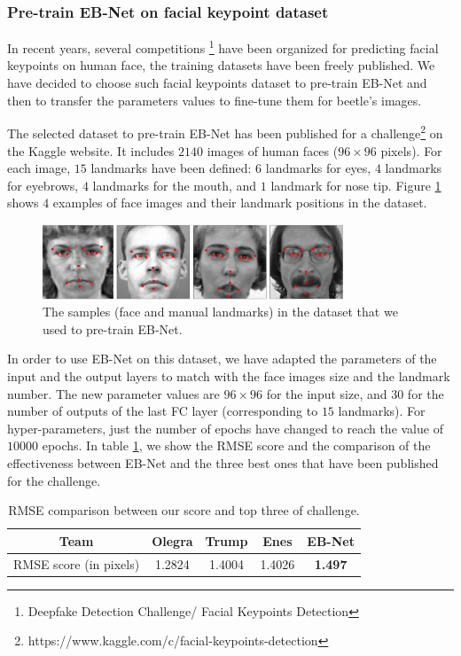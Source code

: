 \documentclass[review]{elsarticle}
\begin{document}
\subsubsection{Pre-train EB-Net on facial keypoint dataset}
In recent years, several competitions \footnote{Deepfake Detection
  Challenge/ Facial Keypoints Detection} have been organized for
predicting facial keypoints on human face, the training datasets have
been freely published. We have decided to
choose such facial keypoints dataset to pre-train EB-Net and  then to 
transfer the parameters values to fine-tune them for beetle's
images. 

The selected dataset to pre-train EB-Net has been published for a challenge\footnote{https://www.kaggle.com/c/facial-keypoints-detection} on the Kaggle website. It includes $2140$ images of human faces ($96 \times 96$ pixels). For each image, $15$ landmarks have been defined: $6$ landmarks for eyes, $4$ landmarks for eyebrows, $4$ landmarks for the mouth, and $1$ landmark for nose tip. Figure \ref{fighmface} shows $4$ examples of face images and their landmark positions in the dataset.

\begin{figure}[h!]
	\centering
	\includegraphics[width=0.80\textwidth]{images/face_dataset_2}
	\caption{The samples (face and manual landmarks) in the dataset that we used to pre-train EB-Net.}
	\label{fighmface}
\end{figure}

In order to use EB-Net on this dataset, we have adapted the parameters
of the input and the output layers to match with the face images size
and the landmark number. The new parameter values are $96 \times 96$
for the input size, and $30$ for the number of outputs of the last FC
layer (corresponding to $15$ landmarks). For hyper-parameters, just
the number of epochs have changed to reach the value of $10000$
epochs. In table \ref{tblRMSE_challenge}, we show the RMSE score and
the comparison of the effectiveness between EB-Net and the three best
ones that have been published for the challenge.


\begin{table}[h!]
	\centering
	\begin{tabular}{ | c | c | c | c | c |}
	\hline
	Team & Olegra & Trump & Enes & EB-Net \\ \hline
	RMSE score (in pixels) & 1.2824 & 1.4004 & 1.4026 & \textbf{1.497} \\ \hline
\end{tabular}	
	\caption{RMSE comparison between our score and top three of challenge.}
	\label{tblRMSE_challenge}
\end{table}
\end{document}
